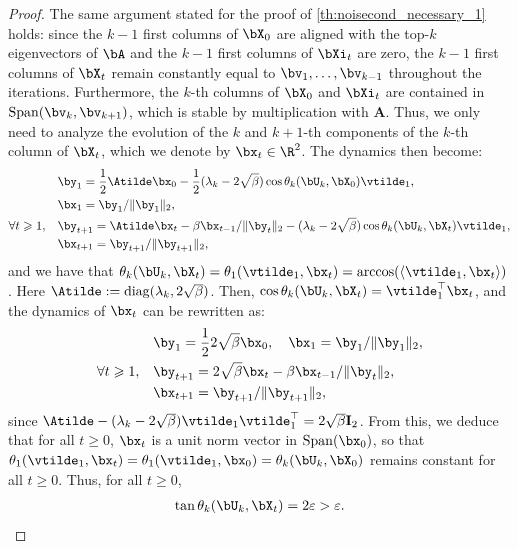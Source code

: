 \documentclass{article}
\theoremstyle{plain}
\theoremstyle{definition}
\theoremstyle{remark}
\begin{document}
\begin{proof}
  The same argument stated for the proof of \cref{th:noisecond_necessary_1} holds: since the $k-1$ first columns of $\bX_0$ are aligned with the top-$k$ eigenvectors of $\bA$ and the $k-1$ first columns of $\bXi_t$ are zero, the $k-1$ first columns of $\bX_t$ remain constantly equal to $\bv_1,\dots,\bv_{k-1}$ throughout the iterations. Furthermore, the $k$-th columns of $\bX_0$ and $\bXi_t$ are contained in $\mathrm{Span}(\bv_k,\bv_{k+1})$, which is stable by multiplication with $\mathbf{A}$. Thus, we only need to analyze the evolution of the $k$ and $k+1$-th components of the $k$-th column of $\bX_t$, which we denote by $\bx_t \in \R^2$. The dynamics then become:
  \begin{align*}
    & \by_1  = \frac{1}{2}\Atilde \bx_0 - \frac{1}{2} (\lambda_k-2\sqrt{\beta}) \cos\theta_k(\bU_k,\bX_0) \vtilde_1,\\
    & \bx_1= \by_1/\Vert\by_1\Vert_2, \\
    \forall t \geqslant 1, \quad&  \by_{t+1}  = \Atilde \bx_t - \beta \bx_{t-1} /\Vert\by_t\Vert_2 - (\lambda_k - 2\sqrt{\beta}) \cos\theta_k(\bU_k, \bX_t) \vtilde_1, \\
    & \bx_{t+1} = \by_{t+1}/\Vert \by_{t+1} \Vert_2,
  \end{align*}
  and we have that $\theta_k(\bU_k, \bX_t) = \theta_1(\vtilde_1, \bx_t) = \arccos(\langle\vtilde_1,\bx_t \rangle)$. Here $\Atilde := \mathrm{diag}(\lambda_k, 2\sqrt{\beta})$. Then, $\cos\theta_k(\bU_k,\bX_t) = \vtilde_1^\top\bx_t$, and the dynamics of $\bx_t$ can be rewritten as:
  \begin{align*}
    & \by_1  = \frac{1}{2} 2\sqrt{\beta} \bx_0, \quad \bx_1= \by_1/\Vert\by_1\Vert_2, \\
    \forall t \geqslant 1, \quad&  \by_{t+1}  = 2\sqrt{\beta} \bx_t - \beta \bx_{t-1} /\Vert\by_t\Vert_2, \\
    & \bx_{t+1} = \by_{t+1}/\Vert \by_{t+1} \Vert_2,
  \end{align*}
  since $\Atilde - (\lambda_k-2\sqrt{\beta})\vtilde_1 \vtilde_1^\top = 2\sqrt{\beta} \mathbf{I}_2$. From this, we deduce that for all $t\geqslant 0$, $\bx_t$ is a unit norm vector in $\mathrm{Span}(\bx_{0})$, so that $\theta_1(\vtilde_1, \bx_t) = \theta_1(\vtilde_1, \bx_0) = \theta_k(\bU_k, \bX_0)$ remains constant for all $t\geqslant 0$. Thus, for all $t\geqslant 0$,
  \begin{align*}
    \tan\theta_k(\bU_k,\bX_t) = 2\varepsilon > \varepsilon.
  \end{align*}

\end{proof}
\end{document}
